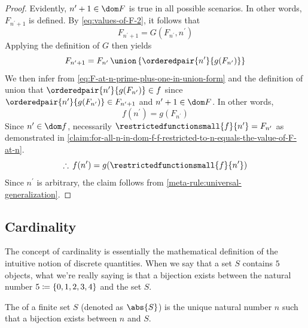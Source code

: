 \begin{proof}
    \vspace{0.3cm}
    \noindent
    Evidently, \( n^{\prime} + 1 \in \dom F \) is true in all possible scenarios.
    In other words, \( F_{n^{\prime} + 1} \) is defined.
    By \eqref{eq:values-of-F-2}, it follows that
    \begin{equation*}
        F_{n^{\prime} + 1} = G(F_{n^{\prime}}, n^{\prime})
    \end{equation*}
    Applying the definition of \( G \) then yields
    \begin{equation}
        \label{eq:F-at-n-prime-plus-one-union-form}
        F_{n^{\prime} + 1} = F_{n^{\prime}} \,{\union}\, \mleft\{ \orderedpair{n^{\prime}}{g(F_{n^{\prime}})} \mright\}
    \end{equation}
    We then infer from \eqref{eq:F-at-n-prime-plus-one-in-union-form} and the definition of union that \( \orderedpair{n^{\prime}}{g(F_{n^{\prime}})} \in f \) since
    \( \orderedpair{n^{\prime}}{g(F_{n^{\prime}})} \in F_{n^{\prime} + 1} \) and \( n^{\prime} + 1 \in \dom F \).
    In other words,
    \begin{equation*}
        f(n^{\prime}) = g(F_{n^{\prime}})
    \end{equation*}
    Since \( n^{\prime} \in \dom f \), necessarily \( \restrictedfunctionsmall{f}{n^{\prime}} = F_{n^{\prime}} \)
    as demonstrated in \cref{claim:for-all-n-in-dom-f-f-restricted-to-n-equals-the-value-of-F-at-n}.
    \begin{equation*}
        \therefore \, f(n^{\prime}) = g( \restrictedfunctionsmall{f}{n^{\prime}} )
    \end{equation*}
    Since \( n^{\prime} \) is arbitrary, the claim follows from \cref{meta-rule:universal-generalization}.
\end{proof}

\subsection{Cardinality}
\noindent
The concept of cardinality is essentially the mathematical definition of the intuitive notion of discrete quantities.
When we say that a set \( S \) contains \( 5 \) objects, what we're really saying is that a bijection
exists between the natural number \( 5 \coloneq \mleft\{ 0, 1, 2, 3, 4 \mright\} \) and the set \( S \).

\begin{dfn}[Cardinality]
     \label{dfn:metatheory-cardinality-of-finite-sets}
    The  of a finite set \( S \) (denoted as \( \abs{S} \)) is the unique natural number \( n \) such that
    a bijection exists between \( n \) and \( S \).
\end{dfn}

